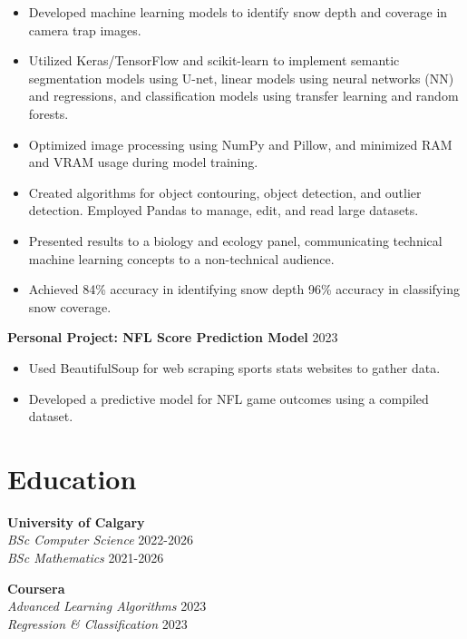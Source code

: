 \documentclass[a4paper,11pt]{article}
\begin{document}
\begin{itemize}[leftmargin=0.0cm]
    \item Developed machine learning models to identify snow depth and coverage in camera trap images.
    \item Utilized Keras/TensorFlow and scikit-learn to implement semantic segmentation models using U-net, linear models using neural networks (NN) and regressions, and classification models using transfer learning and random forests.
    \item Optimized image processing using NumPy and Pillow, and minimized RAM and VRAM usage during model training.
    \item Created algorithms for object contouring, object detection, and outlier detection. Employed Pandas to manage, edit, and read large datasets.
    \item Presented results to a biology and ecology panel, communicating technical machine learning concepts to a non-technical audience.
    \item Achieved 84\% accuracy in identifying snow depth 96\% accuracy in classifying snow coverage.
\end{itemize}

\vspace{0.5cm}

\textbf{Personal Project: NFL Score Prediction Model} \hfill 2023
\begin{itemize}[leftmargin=0.5cm]
    \item Used BeautifulSoup for web scraping sports stats websites to gather data.
    \item Developed a predictive model for NFL game outcomes using a compiled dataset.
\end{itemize}

\vspace{0.2cm}

\section*{Education}

\noindent
\begin{minipage}[t]{0.45\textwidth} %
    \textbf{University of Calgary} \\
    \textit{BSc Computer Science} \hfill 2022-2026 \\
    \textit{BSc Mathematics} \hfill 2021-2026
\end{minipage}
\hfill %
\begin{minipage}[t]{0.45\textwidth} %
    \textbf{Coursera} \\
    \textit{Advanced Learning Algorithms} \hfill 2023 \\
    \textit{Regression \& Classification} \hfill 2023
\end{minipage}
\end{document}
